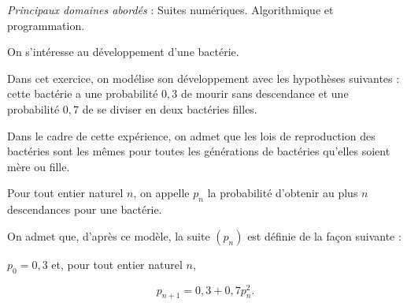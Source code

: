 \medskip

\emph{Principaux domaines abordés} : Suites numériques.
Algorithmique et programmation.

\bigskip

On s'intéresse au développement d'une bactérie.

Dans cet exercice, on modélise son développement avec les hypothèses suivantes : cette bactérie a une probabilité $0,3$ de mourir sans descendance et une probabilité $0,7$ de se diviser en deux bactéries filles.

Dans le cadre de cette expérience, on admet que les lois de reproduction des bactéries sont les mêmes pour toutes les générations de bactéries qu'elles soient mère ou fille.

Pour tout entier naturel $n$, on appelle $p_n$ la probabilité d'obtenir au plus $n$ descendances pour une bactérie. 

On admet que, d'après ce modèle, la suite $\left(p_n\right)$ est définie de la façon suivante :

$p_0 = 0,3$ et, pour tout entier naturel $n$,

\[p_{n+1} = 0,3 + 0,7p_n^2.\]

